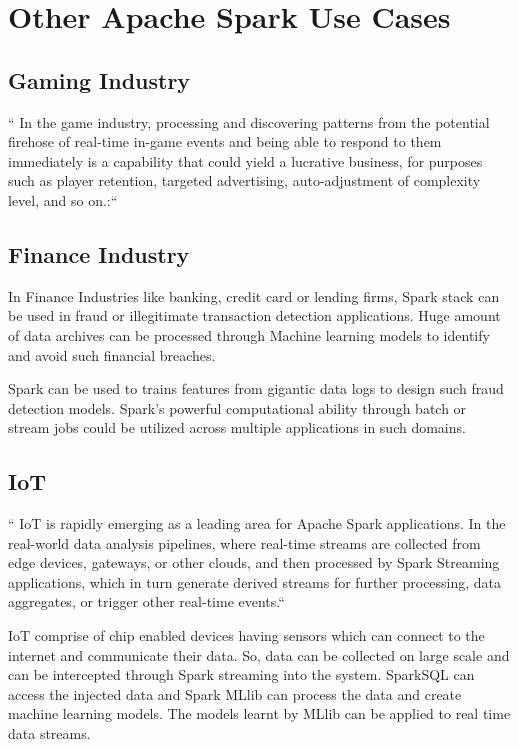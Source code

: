 \section{Other Apache Spark Use Cases}

\subsection{Gaming Industry}

`` In the game industry, processing and discovering patterns from the potential firehose of real-time in-game
events and being able to respond to them immediately is a capability that could yield a lucrative business,
for purposes such as player retention, targeted advertising, auto-adjustment of complexity level,
and so on.:``~\cite{hid-sp18-522-deepcore}

\subsection{Finance Industry}

In Finance Industries like banking, credit card or lending firms, Spark stack can be used in fraud or illegitimate
transaction detection applications. Huge amount of data archives can be processed through Machine learning
models to identify and avoid such financial breaches.

Spark can be used to trains features from gigantic data logs to design such fraud detection models. Spark's powerful
computational ability through batch or stream jobs could be utilized across multiple applications in such domains.


\subsection{IoT}

`` IoT is rapidly emerging as a leading area for Apache Spark applications. In the real-world data analysis
pipelines, where real-time streams are collected from edge devices, gateways, or other clouds, and then
processed by Spark Streaming applications, which in turn generate derived streams for further processing,
data aggregates, or trigger other real-time events.``~\cite{hid-sp18-522-IoT}

IoT comprise of chip enabled devices having sensors which can connect to the internet and communicate their data.
So, data can be collected on large scale and can be intercepted through Spark streaming into the system.
SparkSQL can access the injected data and Spark MLlib can process the data and create machine learning models.
The models learnt by MLlib can be applied to real time data streams.


